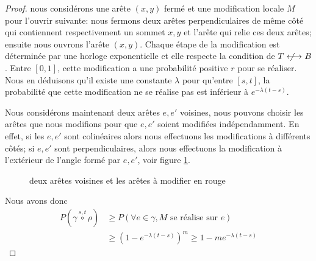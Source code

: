 \documentclass[titlepage,a4paper,12pt]{article}
\newcommand{\nlongleftrightarrow}{\longleftrightarrow \kern-15pt\not \kern15pt}
\begin{document}
\begin{proof}
nous considérons une arête $(x,y)$ fermé et une modification locale $M$ pour l'ouvrir suivante: nous fermons deux arêtes perpendiculaires de même côté qui contiennent respectivement un sommet $x,y$ et l'arête qui relie ces deux arêtes; ensuite nous ouvrons l'arête $(x,y)$. Chaque étape de la modification est déterminée par une horloge exponentielle et elle respecte la condition de $T\nlongleftrightarrow B$. Entre $[0,1]$, cette modification a une probabilité positive $r$ pour se réaliser. Nous en déduisons qu'il existe une constante $\lambda$ pour qu'entre $[s,t]$, la probabilité que cette modification ne se réalise pas est inférieur à $e^{-\lambda(t-s)}$. 

Nous considérons maintenant deux arêtes $e,e'$ voisines, nous pouvons choisir les arêtes que nous modifions pour que $e,e'$ soient modifiées indépendamment. En effet, si les $e,e'$ sont colinéaires alors nous effectuons les modifications à différents côtés; si $e,e'$ sont perpendiculaires, alors nous effectuons la modification à l'extérieur de l'angle formé par $e,e'$, voir figure \ref{fig:mod}.

\begin{figure}[h]

\begin{minipage}{0.45\linewidth}
\center
{}
\end{minipage}
\hfill
\begin{minipage}{0.45\linewidth}
\center
{}
\end{minipage}
\caption{deux arêtes voisines et les arêtes à modifier en rouge}
\label{fig:mod}

\end{figure}

Nous avons donc 
\begin{align*}
 P(\gamma \overset{s,t}{\circ} \rho) &\geqslant P(\forall e \in \gamma, M \text{ se réalise sur } e) \\
 & \geqslant (1-e^{-\lambda (t-s)})^m \geqslant 1-me^{-\lambda (t-s)}
\end{align*} 
\end{proof}
\end{document}
